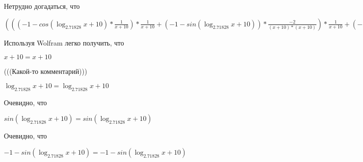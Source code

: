 \documentclass[12pt,a4paper,fleqn]{article}
\theoremstyle{definition}
\begin{document}
Нетрудно догадаться, что

$((( -1  - cos(\log_{ 2.71828 }{ x  +  10 }) * \frac{ 1 }{ x  +  10 }
) * \frac{ 1 }{ x  +  10 }
 + ( -1  - sin(\log_{ 2.71828 }{ x  +  10 })) * \frac{ -2 }{( x  +  10 ) * ( x  +  10 )}
) * \frac{ 1 }{ x  +  10 }
 + ( -1  - sin(\log_{ 2.71828 }{ x  +  10 })) * \frac{ 1 }{ x  +  10 }
 * \frac{ -2 }{( x  +  10 ) * ( x  +  10 )}
 + ( -1  - sin(\log_{ 2.71828 }{ x  +  10 })) * \frac{ 1 }{ x  +  10 }
 * \frac{ -2 }{( x  +  10 ) * ( x  +  10 )}
 + cos(\log_{ 2.71828 }{ x  +  10 }) * \frac{ -1  -  -2  * ( x  +  10  +  x  +  10 )}{( x  +  10 ) * ( x  +  10 ) * ( x  +  10 ) * ( x  +  10 )}
) * { 3 }^{sin(\log_{ 2.71828 }{ x  +  10 })} + (( -1  - sin(\log_{ 2.71828 }{ x  +  10 })) * \frac{ 1 }{ x  +  10 }
 * \frac{ 1 }{ x  +  10 }
 + cos(\log_{ 2.71828 }{ x  +  10 }) * \frac{ -2 }{( x  +  10 ) * ( x  +  10 )}
) * cos(\log_{ 2.71828 }{ x  +  10 }) * \frac{ 1 }{ x  +  10 }
 * { 3 }^{sin(\log_{ 2.71828 }{ x  +  10 })} = ((( -1  - cos(\log_{ 2.71828 }{ x  +  10 }) * \frac{ 1 }{ x  +  10 }
) * \frac{ 1 }{ x  +  10 }
 + ( -1  - sin(\log_{ 2.71828 }{ x  +  10 })) * \frac{ -2 }{( x  +  10 ) * ( x  +  10 )}
) * \frac{ 1 }{ x  +  10 }
 + ( -1  - sin(\log_{ 2.71828 }{ x  +  10 })) * \frac{ 1 }{ x  +  10 }
 * \frac{ -2 }{( x  +  10 ) * ( x  +  10 )}
 + ( -1  - sin(\log_{ 2.71828 }{ x  +  10 })) * \frac{ 1 }{ x  +  10 }
 * \frac{ -2 }{( x  +  10 ) * ( x  +  10 )}
 + cos(\log_{ 2.71828 }{ x  +  10 }) * \frac{ -1  -  -2  * ( x  +  10  +  x  +  10 )}{( x  +  10 ) * ( x  +  10 ) * ( x  +  10 ) * ( x  +  10 )}
) * { 3 }^{sin(\log_{ 2.71828 }{ x  +  10 })} + (( -1  - sin(\log_{ 2.71828 }{ x  +  10 })) * \frac{ 1 }{ x  +  10 }
 * \frac{ 1 }{ x  +  10 }
 + cos(\log_{ 2.71828 }{ x  +  10 }) * \frac{ -2 }{( x  +  10 ) * ( x  +  10 )}
) * cos(\log_{ 2.71828 }{ x  +  10 }) * \frac{ 1 }{ x  +  10 }
 * { 3 }^{sin(\log_{ 2.71828 }{ x  +  10 })}$

Используя Wolfram легко получить, что

$ x  +  10  =  x  +  10 $

(((Какой-то комментарий)))

$\log_{ 2.71828 }{ x  +  10 } = \log_{ 2.71828 }{ x  +  10 }$

Очевидно, что

$sin(\log_{ 2.71828 }{ x  +  10 }) = sin(\log_{ 2.71828 }{ x  +  10 })$

Очевидно, что

$ -1  - sin(\log_{ 2.71828 }{ x  +  10 }) =  -1  - sin(\log_{ 2.71828 }{ x  +  10 })$
\end{document}
